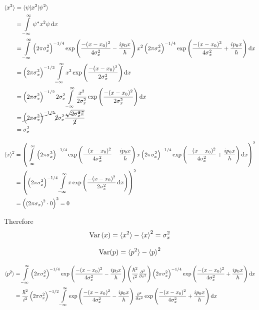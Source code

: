 \documentclass[a4paper,german,12pt,smallheadings]{scrartcl}
\DeclareMathOperator{\Var}{Var}
\begin{document}
\begin{enumerate}[a)]
    \begin{align*}
      \braket{x^2} &= \braket{\psi|x^2|\psi^2} \\
                   &= \int\limits_{-\infty}^{\infty} \psi^* x^2 \psi \dif x \\
                   &= \int\limits_{-\infty}^\infty
      \del{2 \pi \sigma_x^2}^{-1/4} \exp\del{\frac{-(x-x_0)^2}{4 \sigma_x^2} - \frac{ip_0x}{\hbar}}
      x^2
      \del{2 \pi \sigma_x^2}^{-1/4} \exp\del{\frac{-(x-x_0)^2}{4 \sigma_x^2} + \frac{ip_0x}{\hbar}}
      \dif x \\
                   &=
      \del{2 \pi \sigma_x^2}^{-1/2}
      \int\limits_{-\infty}^\infty x^2 \exp\del{\frac{-(x-x_0)^2}{2 \sigma_x^2}} \dif x \\
      &= \del{2 \pi \sigma_x^2}^{-1/2} 2 \sigma_x^2
      \int\limits_{-\infty}^\infty \frac{x^2}{2 \sigma_x^2} \exp\del{\frac{-(x-x_0)^2}{2 \sigma_x^2}} \dif x \\
      &= \cancel{\del{2 \pi \sigma_x^2}^{-1/2}} \cancel{2} \sigma_x^2 \frac{\cancel{\sqrt{2 \sigma_x^2 \pi}}}{\cancel{2}} \\
      &= \sigma_x^2
    \end{align*}

    \begin{align*}
      \braket{x}^2 &= 
      \del{\int\limits_{-\infty}^\infty
      \del{2 \pi \sigma_x^2}^{-1/4} \exp\del{\frac{-(x-x_0)^2}{4 \sigma_x^2} - \frac{ip_0x}{\hbar}}
      x
      \del{2 \pi \sigma_x^2}^{-1/4} \exp\del{\frac{-(x-x_0)^2}{4 \sigma_x^2} + \frac{ip_0x}{\hbar}}
      \dif x}^2 \\
      &= \del{\del{2 \pi \sigma_x^2}^{-1/4} \int\limits_{-\infty}^\infty x \exp\del{\frac{-(x-x_0)^2}{2\sigma_x^2} \dif x}}^2 \\
      &= \del{\del{2 \pi \sigma_x}^2 \cdot 0}^2 = 0
    \end{align*}

    Therefore
    \begin{align*}
      \Var\del{x} = \braket{x^2} - \braket{x}^2 = \sigma_x^2
    \end{align*}

    \begin{align*}
      \Var(p) = \braket{p^2} - \braket{p}^2
    \end{align*}

    \begin{align*}
      \braket{p^2} &= 
        \int\limits_{-\infty}^\infty
        \del{2 \pi \sigma_x^2}^{-1/4} \exp\del{\frac{-(x-x_0)^2}{4 \sigma_x^2} - \frac{ip_0x}{\hbar}}
        \del{\frac{\hbar^2}{i^2} \pd[2]{}{x}}
        \del{2 \pi \sigma_x^2}^{-1/4} \exp\del{\frac{-(x-x_0)^2}{4 \sigma_x^2} + \frac{ip_0x}{\hbar}}
        \dif x \\
        &= \frac{\hbar^2}{i^2} \del{2 \pi \sigma_x^2}^{-1/2} \int\limits_{-\infty}^\infty
        \exp\del{\frac{-(x-x_0)^2}{4 \sigma_x^2} - \frac{ip_0x}{\hbar}}
        \pd[2]{}{x}
        \exp\del{\frac{-(x-x_0)^2}{4 \sigma_x^2} + \frac{ip_0x}{\hbar}}
        \dif x \\
    \end{align*}


\end{enumerate}
\end{document}
